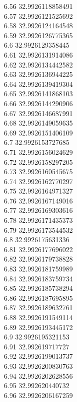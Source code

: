 {6.56	32.9926118858491\\
6.57	32.9926121525692\\
6.58	32.9926124164548\\
6.59	32.9926126775365\\
6.6	32.9926129358445\\
6.61	32.9926131914086\\
6.62	32.9926134442582\\
6.63	32.9926136944225\\
6.64	32.9926139419304\\
6.65	32.9926141868103\\
6.66	32.9926144290906\\
6.67	32.9926146687991\\
6.68	32.9926149059635\\
6.69	32.9926151406109\\
6.7	32.9926153727685\\
6.71	32.9926156024629\\
6.72	32.9926158297205\\
6.73	32.9926160545675\\
6.74	32.9926162770297\\
6.75	32.9926164971327\\
6.76	32.9926167149016\\
6.77	32.9926169303616\\
6.78	32.9926171435373\\
6.79	32.9926173544532\\
6.8	32.9926175631336\\
6.81	32.9926177696022\\
6.82	32.9926179738828\\
6.83	32.9926181759989\\
6.84	32.9926183759734\\
6.85	32.9926185738294\\
6.86	32.9926187695895\\
6.87	32.9926189632761\\
6.88	32.9926191549114\\
6.89	32.9926193445172\\
6.9	32.9926195321153\\
6.91	32.992619717727\\
6.92	32.9926199013737\\
6.93	32.9926200830763\\
6.94	32.9926202628556\\
6.95	32.992620440732\\
6.96	32.9926206167259\\
}
